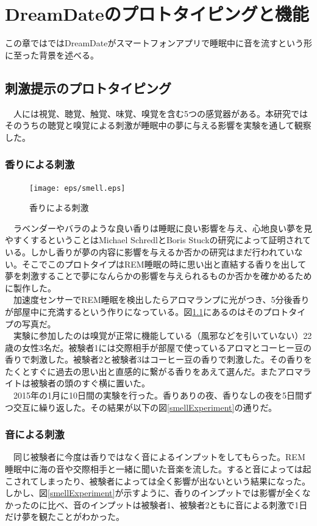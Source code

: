 \chapter{DreamDateのプロトタイピングと機能}
\label{chap:search}


この章ではではDreamDateがスマートフォンアプリで睡眠中に音を流すという形に至った背景を述べる。

\section{刺激提示のプロトタイピング}
　人には視覚、聴覚、触覚、味覚、嗅覚を含む5つの感覚器がある。本研究ではそのうちの聴覚と嗅覚による刺激が睡眠中の夢に与える影響を実験を通して観察した。

\subsection{香りによる刺激}
\begin{figure}[htbp]
\begin{center}
\texttt{[image: eps/smell.eps]}
\caption{香りによる刺激}
\label{smell}
\end{center}
\end{figure}

　ラベンダーやバラのような良い香りは睡眠に良い影響を与え、心地良い夢を見やすくするということはMichael SchredlとBoris Stuckの研究によって証明されている\cite{roseDream}。しかし香りが夢の内容に影響を与えるか否かの研究はまだ行われていない。そこでこのプロトタイプはREM睡眠の時に思い出と直結する香りを出して夢を刺激することで夢になんらかの影響を与えられるものか否かを確かめるために製作した。\\
　加速度センサーでREM睡眠を検出したらアロマランプに光がつき、5分後香りが部屋中に充満するという作りになっている。図\ref{smell}にあるのはそのプロトタイプの写真だ。\\
　実験に参加したのは嗅覚が正常に機能している（風邪などを引いていない）22歳の女性3名だ。被験者1には交際相手が部屋で使っているアロマとコーヒー豆の香りで刺激した。被験者2と被験者3はコーヒー豆の香りで刺激した。その香りをたくとすぐに過去の思い出と直感的に繋がる香りをあえて選んだ。またアロマライトは被験者の頭のすぐ横に置いた。\\
　2015年の1月に10日間の実験を行った。香りありの夜、香りなしの夜を5日間ずつ交互に繰り返した。その結果が以下の図\ref{smellExperiment}の通りだ。

\subsection{音による刺激}
　同じ被験者に今度は香りではなく音によるインプットをしてもらった。REM睡眠中に海の音や交際相手と一緒に聞いた音楽を流した。すると音によっては起こされてしまったり、被験者によっては全く影響が出ないという結果になった。しかし、図\ref{smellExperiment}が示すように、香りのインプットでは影響が全くなかったのに比べ、音のインプットは被験者1、被験者2ともに音による刺激で1日だけ夢を観たことがわかった。


